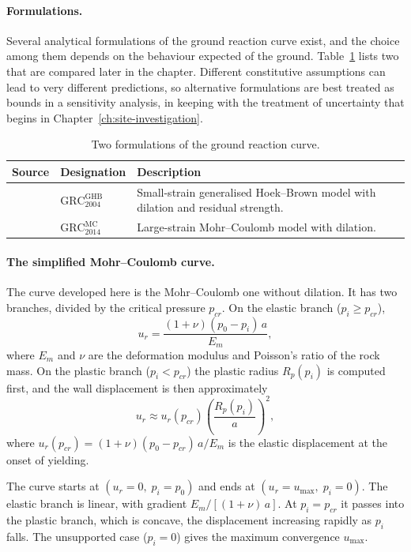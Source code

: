 \paragraph{Formulations.}
Several analytical formulations of the ground reaction curve exist, and the
choice among them depends on the behaviour expected of the ground.
Table~\ref{tab:grc-formulations} lists two that are compared later in the
chapter. Different constitutive assumptions can lead to very different
predictions, so alternative formulations are best treated as bounds in a
sensitivity analysis, in keeping with the treatment of uncertainty that
begins in Chapter~\ref{ch:site-investigation}.

\begin{table}[htbp]
\caption{Two formulations of the ground reaction curve.}
\label{tab:grc-formulations}
\centering
\small
\begin{tabularx}{\textwidth}{l l X}
\toprule
\textbf{Source} & \textbf{Designation} & \textbf{Description} \\
\midrule
\citet{carranzatorres2004ghb} & $\mathrm{GRC}^{\mathrm{GHB}}_{2004}$ & Small-strain generalised Hoek--Brown model with dilation and residual strength. \\
\citet{vrakas2014finite} & $\mathrm{GRC}^{\mathrm{MC}}_{2014}$ & Large-strain Mohr--Coulomb model with dilation. \\
\bottomrule
\end{tabularx}
\end{table}

\paragraph{The simplified Mohr--Coulomb curve.}
The curve developed here is the Mohr--Coulomb one without dilation. It has
two branches, divided by the critical pressure $p_{cr}$. On the elastic
branch ($p_i \geq p_{cr}$),
\[
u_r = \frac{(1+\nu)(p_0 - p_i)\,a}{E_m} ,
\]
where $E_m$ and $\nu$ are the deformation modulus and Poisson's ratio of the
rock mass. On the plastic branch ($p_i < p_{cr}$) the plastic radius $R_p(p_i)$ is
computed first, and the wall displacement is then approximately
\[
u_r \approx u_r(p_{cr}) \left(\frac{R_p(p_i)}{a}\right)^2 ,
\]
where $u_r(p_{cr}) = (1+\nu)(p_0-p_{cr})\,a/E_m$ is the elastic displacement
at the onset of yielding.

The curve starts at $(u_r=0,\; p_i=p_0)$ and ends at
$(u_r=u_{\max},\; p_i=0)$. The elastic branch is linear, with gradient
$E_m/[(1+\nu)\,a]$. At $p_i = p_{cr}$ it passes into the plastic branch,
which is concave, the displacement increasing rapidly as $p_i$ falls. The
unsupported case ($p_i = 0$) gives the maximum convergence $u_{\max}$.

